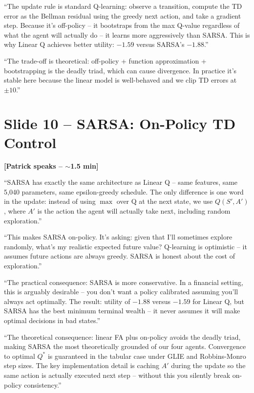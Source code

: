 \documentclass[11pt, letterpaper]{article}
\begin{document}
``The update rule is standard Q-learning: observe a transition, compute the TD error as the Bellman residual using the greedy next action, and take a gradient step. Because it's off-policy -- it bootstraps from the max Q-value regardless of what the agent will actually do -- it learns more aggressively than SARSA. This is why Linear Q achieves better utility: $-1.59$ versus SARSA's $-1.88$.''

``The trade-off is theoretical: off-policy + function approximation + bootstrapping is the deadly triad, which can cause divergence. In practice it's stable here because the linear model is well-behaved and we clip TD errors at $\pm 10$.''

\section{Slide 10 -- SARSA: On-Policy TD Control}

\textbf{[Patrick speaks -- $\sim$1.5 min]}

``SARSA has exactly the same architecture as Linear Q -- same features, same 5,040 parameters, same epsilon-greedy schedule. The only difference is one word in the update: instead of using $\max$ over Q at the next state, we use $Q(S', A')$, where $A'$ is the action the agent will actually take next, including random exploration.''

``This makes SARSA on-policy. It's asking: given that I'll sometimes explore randomly, what's my realistic expected future value? Q-learning is optimistic -- it assumes future actions are always greedy. SARSA is honest about the cost of exploration.''

``The practical consequence: SARSA is more conservative. In a financial setting, this is arguably desirable -- you don't want a policy calibrated assuming you'll always act optimally. The result: utility of $-1.88$ versus $-1.59$ for Linear Q, but SARSA has the best minimum terminal wealth -- it never assumes it will make optimal decisions in bad states.''

``The theoretical consequence: linear FA plus on-policy avoids the deadly triad, making SARSA the most theoretically grounded of our four agents. Convergence to optimal $Q^*$ is guaranteed in the tabular case under GLIE and Robbins-Monro step sizes. The key implementation detail is caching $A'$ during the update so the same action is actually executed next step -- without this you silently break on-policy consistency.''
\end{document}
